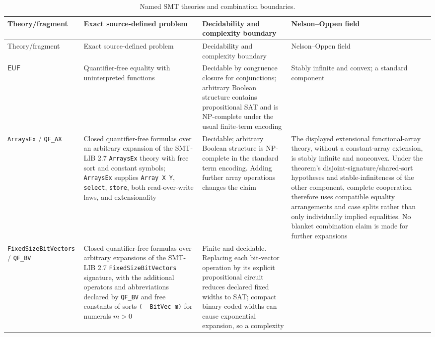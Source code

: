 \begin{landscape}
\thispagestyle{plain}
\begingroup\scriptsize
\setlength{\tabcolsep}{3pt}
\begin{longtable}{@{}p{.95in}p{1.90in}p{2.15in}p{2.15in}@{}}
\caption{Named SMT theories and combination boundaries.}
\label{tab:p12-smt-theories}\\
\toprule
Theory/fragment & Exact source-defined problem & Decidability and complexity boundary
& Nelson--Oppen field \\ \midrule
\endfirsthead
\toprule
Theory/fragment & Exact source-defined problem & Decidability and complexity boundary
& Nelson--Oppen field \\ \midrule
\endhead
\(\mathsf{EUF}\) & Quantifier-free equality with uninterpreted functions &
Decidable by congruence closure for conjunctions; arbitrary Boolean structure
contains propositional SAT and is NP-complete under the usual finite-term
encoding & Stably infinite and convex; a standard component
\cite{BarrettSebastianiSeshiaTinelli2009} \\ \addlinespace
\texttt{ArraysEx} / \texttt{QF\_AX} & Closed quantifier-free formulas over
an arbitrary expansion of the SMT-LIB 2.7 \texttt{ArraysEx} theory with free
sort and constant symbols; \texttt{ArraysEx} supplies \texttt{Array X Y},
\texttt{select}, \texttt{store}, both read-over-write laws, and extensionality &
Decidable; arbitrary Boolean
structure is NP-complete in the standard term encoding.  Adding further array
operations changes the claim & The displayed extensional functional-array
theory, without a constant-array extension, is stably infinite and nonconvex.
Under the theorem's disjoint-signature/shared-sort hypotheses and
stable-infiniteness of the other component, complete cooperation therefore
uses compatible equality arrangements and case splits rather than only
individually implied equalities.  No blanket combination claim is made for
further expansions
\cite{SMTLIB2025,BarrettSebastianiSeshiaTinelli2009} \\
\addlinespace
\texttt{FixedSizeBitVectors} / \texttt{QF\_BV} & Closed quantifier-free
formulas over arbitrary expansions of the SMT-LIB 2.7
\texttt{FixedSizeBitVectors} signature, with the additional operators and
abbreviations declared by \texttt{QF\_BV} and free constants of sorts
\texttt{(\_ BitVec m)} for numerals \(m>0\) &
Finite and decidable.  Replacing each bit-vector operation by its explicit
propositional circuit reduces declared fixed widths to SAT;
compact binary-coded widths can cause exponential expansion, so a complexity

\end{longtable}
\end{landscape}
